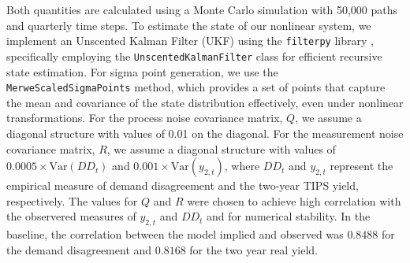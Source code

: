 Both quantities are calculated using a Monte Carlo simulation with 50,000 paths and quarterly time steps. To estimate the state of our nonlinear system, we implement an Unscented Kalman Filter (UKF) using the \texttt{filterpy} library \cite{filterpy}, specifically employing the \texttt{UnscentedKalmanFilter} class for efficient recursive state estimation. For sigma point generation, we use the \texttt{MerweScaledSigmaPoints} method, which provides a set of points that capture the mean and covariance of the state distribution effectively, even under nonlinear transformations. For the process noise covariance matrix, \( Q \), we assume a diagonal structure with values of 0.01 on the diagonal. For the measurement noise covariance matrix, \( R \), we assume a diagonal structure with values of \( 0.0005 \times \text{Var}(DD_t) \) and \( 0.001 \times \text{Var}(y_{2,t}) \), where \( DD_t \) and \( y_{2,t} \) represent the empirical measure of demand disagreement and the two-year TIPS yield, respectively. The values for $Q$ and $R$ were chosen to  achieve high correlation with the observered measures of $y_{2,t}$ and $DD_t$ and for numerical stability. In the baseline, the correlation between the model implied and observed was $0.8488$ for the demand disagreement and $0.8168$ for the two year real yield.  
